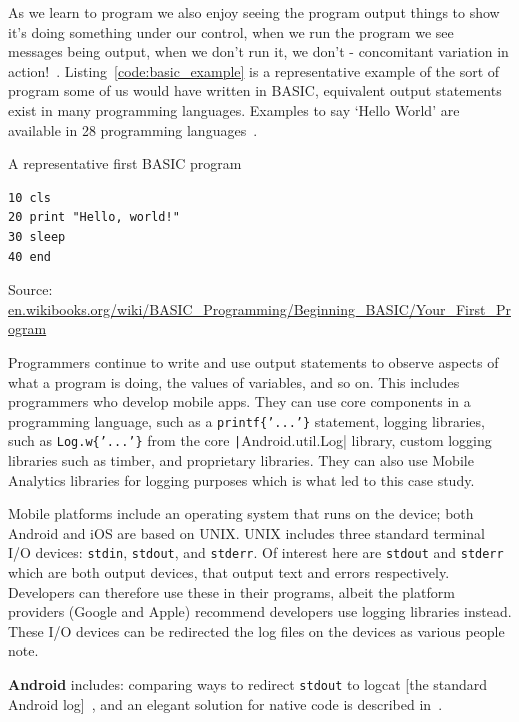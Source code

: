 As we learn to program we also enjoy seeing the program output things to show it's doing something under our control, when we run the program we see messages being output, when we don't run it, we don't - concomitant variation in action!~\citep{mill1884system}. Listing~\ref{code:basic_example} is a representative example of the sort of program some of us would have written in BASIC, equivalent output statements exist in many programming languages. Examples to say `Hello World' are available in 28 programming languages~\citep{helloworld2017}. 

\begin{listing}
\caption{A representative first BASIC program} \label{code:basic_example}
\begin{verbatim}
10 cls
20 print "Hello, world!"
30 sleep
40 end
\end{verbatim}
Source: \href{https://en.wikibooks.org/wiki/BASIC_Programming/Beginning_BASIC/Your_First_Program}{en.wikibooks.org/wiki/BASIC\_Programming/Beginning\_BASIC/Your\_First\_Program}
\end{listing}

Programmers continue to write and use output statements to observe aspects of what a program is doing, the values of variables, and so on. This includes programmers who develop mobile apps. They can use core components in a programming language, such as a \texttt{printf\{'...'\}} statement, logging libraries, such as \texttt{Log.w\{'...'\}} from the core \texttt|Android.util.Log|
library, custom logging libraries such as timber, and proprietary libraries. They can also use Mobile Analytics libraries for logging purposes which is what led to this case study.

Mobile platforms include an operating system that runs on the device; both Android and iOS are based on UNIX. UNIX includes three standard terminal I/O devices: \texttt{stdin}, \texttt{stdout}, and \texttt{stderr}. Of interest here are \texttt{stdout} and \texttt{stderr} which are both output devices, that output text and errors respectively. Developers can therefore use these in their programs, albeit the platform providers (Google and Apple) recommend developers use logging libraries instead. These I/O devices can be redirected the log files on the devices as various people note.

\textbf{Android} includes: comparing ways to redirect \texttt{stdout} to logcat [the standard Android log]~\citep{krysmanski2012_so_redirect-stdout-to-logcat-in-android-NDK, rcdailey2018_ndk_redirect_to_logcats}, and an elegant solution for native code is described in~\citep{tsiombikas2014_native_NDK_stdio_to_android_log}.

